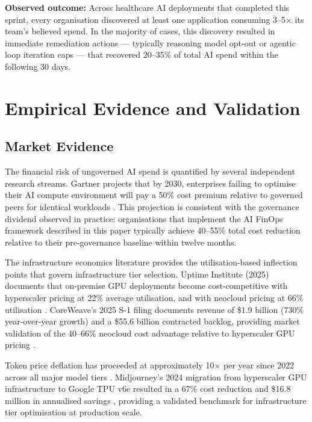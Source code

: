 \documentclass[11pt,twocolumn]{article}
\begin{document}
\begin{callout}
\small\textbf{Observed outcome:} Across healthcare AI deployments that completed
this sprint, every organisation discovered at least one application consuming
3--5$\times$ its team's believed spend. In the majority of cases, this discovery
resulted in immediate remediation actions --- typically reasoning model opt-out
or agentic loop iteration caps --- that recovered 20--35\% of total AI spend
within the following 30 days.
\end{callout}

\section{Empirical Evidence and Validation}
\label{sec:evidence}

\subsection{Market Evidence}

The financial risk of ungoverned AI spend is quantified by several independent
research streams. Gartner projects that by 2030, enterprises failing to optimise
their AI compute environment will pay a 50\% cost premium relative to governed
peers for identical workloads \citep{gartner2025forecast}. This projection is
consistent with the governance dividend observed in practice: organisations that
implement the AI FinOps framework described in this paper typically achieve
40--55\% total cost reduction relative to their pre-governance baseline within
twelve months.

The infrastructure economics literature provides the utilisation-based inflection
points that govern infrastructure tier selection. Uptime Institute (2025) documents
that on-premise GPU deployments become cost-competitive with hyperscaler pricing
at 22\% average utilisation, and with neocloud pricing at 66\% utilisation
\citep{uptime2025}. CoreWeave's 2025 S-1 filing documents revenue of \$1.9 billion
(730\% year-over-year growth) and a \$55.6 billion contracted backlog, providing
market validation of the 40--66\% neocloud cost advantage relative to hyperscaler
GPU pricing \citep{coreweave2025}.

Token price deflation has proceeded at approximately 10$\times$ per year since
2022 across all major model tiers \citep{introl2025}. Midjourney's 2024
migration from hyperscaler GPU infrastructure to Google TPU v6e resulted in a
67\% cost reduction and \$16.8 million in annualised savings \citep{midjourney2024},
providing a validated benchmark for infrastructure tier optimisation at production scale.
\end{document}
